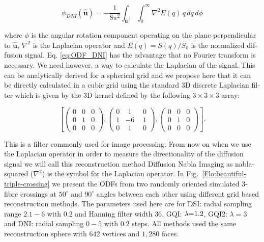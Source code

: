 \documentclass{bioinfo}
\begin{document}
%
\begin{equation}
\psi_{DNI}(\hat{\mathbf{u}})=-\frac{1}{8\pi^{2}}\int_{\hat{\mathbf{u}}^{\perp}}\int_{0}^{\infty}\nabla^{2}E(q)\, q\, dq\, d\phi\label{eq:ODF_DNI}\end{equation}


\noindent where $\phi$ is the angular rotation component operating
on the plane perpendicular to $\hat{\mathbf{u}}$, \foreignlanguage{english}{$\nabla^{2}$
is the Laplacian operator and $E(q)=S(q)/S_{0}$ is the normalized
diffusion signal. Eq. \ref{eq:ODF_DNI} has the advantage that no
Fourier transform is necessary. We need however, a way to calculate
the Laplacian of the signal. This can be analytically derived for
a spherical grid \cite{aganj2010reconstruction} and we propose here
that it can be directly calculated in a cubic grid using the standard
3D discrete Laplacian filter which is given by the 3D kernel defined
by the following $3\times3\times3$ array: }

%
\[
\left[\left(\begin{array}{ccc}
0 & 0 & 0\\
0 & 1 & 0\\
0 & 0 & 0\end{array}\right),\left(\begin{array}{ccc}
0 & \:\,1 & \:\,0\\
1 & -6 & \:\,1\\
0 & \:\,1 & \:\,0\end{array}\right),\left(\begin{array}{ccc}
0 & 0 & 0\\
0 & 1 & 0\\
0 & 0 & 0\end{array}\right)\right].\]


\noindent This is a filter commonly used for image processing. From
now on when we use the Laplacian operator in order to measure the
directionality of the diffusion signal we will call this reconstruction
method Diffusion Nabla Imaging as nabla-squared ($\nabla^{2}$) is
the symbol for the Laplacian operator. In Fig.~\ref{Flo:beautiful-triple-crossing}
we present the ODFs from two randomly oriented simulated $3$-fibre
crossings at $50^{\circ}$ and $90^{\circ}$ angles between each other
using different grid based reconstruction methods. The parameters
used here are for DSI: radial sampling range $2.1-6$ with $0.2$
and Hanning filter width $36$, GQI: $\text{\ensuremath{\lambda}=1.2}$,
GQI2: $\lambda=3$ and DNI: radial sampling $0-5$ with $0.2$ steps.
All methods used the same reconstruction sphere with $642$ vertices
and $1,280$ faces. 
\end{document}

